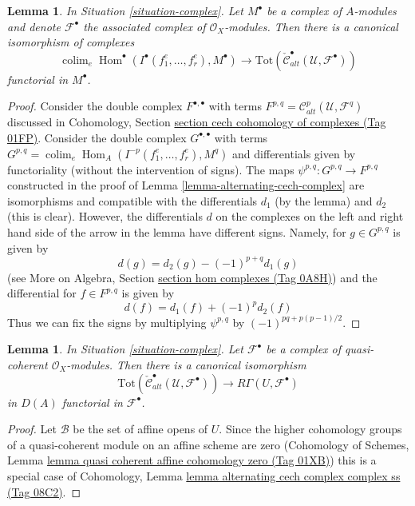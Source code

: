\documentclass{amsart}
\theoremstyle{plain}
\newtheorem{lemma}[subsection]{Lemma}
\theoremstyle{definition}
\theoremstyle{remark}
\numberwithin{equation}{subsection}
\def\colim{\mathop{\mathrm{colim}}\nolimits}
\def\Hom{\mathop{\mathrm{Hom}}\nolimits}
\begin{document}
\begin{lemma}
\label{lemma-alternating-cech-complex-complex}
In Situation \ref{situation-complex}. Let $M^\bullet$ be a
complex of $A$-modules and
denote $\mathcal{F}^\bullet$ the associated complex of
$\mathcal{O}_X$-modules. Then
there is a canonical isomorphism of complexes
$$
\colim_e \Hom^\bullet(I^\bullet(f_1^e, \ldots, f_r^e), M^\bullet)
\longrightarrow
\text{Tot}(\check{\mathcal{C}}_{alt}^\bullet(\mathcal{U}, \mathcal{F}^\bullet))
$$
functorial in $M^\bullet$.
\end{lemma}

\begin{proof}
Consider the double complex $F^{\bullet, \bullet}$ with terms
$F^{p, q} = \mathcal{C}_{alt}^p(\mathcal{U}, \mathcal{F}^q)$
discussed in
Cohomology, Section \href{https://stacks.math.columbia.edu/tag/01FP}{section cech cohomology of complexes (Tag 01FP)}.
Consider the double complex $G^{\bullet, \bullet}$ with terms
$G^{p, q} = \colim_e \Hom_A(I^{-p}(f_1^e, \ldots, f_r^e), M^q)$ and
differentials given by functoriality (without the intervention
of signs). The maps $\psi^{p, q} : G^{p, q} \to F^{p, q}$
constructed in the proof of Lemma \ref{lemma-alternating-cech-complex}
are isomorphisms and compatible with the differentials $d_1$ (by the lemma)
and $d_2$ (this is clear). However, the differentials $d$ on the
complexes on the left and right hand side of the arrow in the lemma
have different signs. Namely, for $g \in G^{p, q}$ is given by
$$
d(g) =  d_2(g) - (-1)^{p + q} d_1(g) 
$$
(see More on Algebra, Section \href{https://stacks.math.columbia.edu/tag/0A8H}{section hom complexes (Tag 0A8H)})
and the differential for $f \in F^{p, q}$ is given by
$$
d(f) = d_1(f) + (-1)^p d_2(f)
$$
Thus we can fix the signs by multiplying $\psi^{p, q}$ by
$(-1)^{pq + p(p - 1)/2}$.
\end{proof}


\begin{lemma}
\label{lemma-alternating-cech-complex-complex-computes-cohomology}
In Situation \ref{situation-complex}. Let $\mathcal{F}^\bullet$
be a complex of quasi-coherent $\mathcal{O}_X$-modules. Then
there is a canonical isomorphism
$$
\text{Tot}(\check{\mathcal{C}}_{alt}^\bullet(\mathcal{U}, \mathcal{F}^\bullet))
\longrightarrow
R\Gamma(U, \mathcal{F}^\bullet)
$$
in $D(A)$ functorial in $\mathcal{F}^\bullet$.
\end{lemma}

\begin{proof}
Let $\mathcal{B}$ be the set of affine opens of $U$. Since the higher
cohomology groups of a quasi-coherent module on an affine scheme are zero
(Cohomology of Schemes, Lemma
\href{https://stacks.math.columbia.edu/tag/01XB}{lemma quasi coherent affine cohomology zero (Tag 01XB)})
this is a special case of
Cohomology, Lemma \href{https://stacks.math.columbia.edu/tag/08C2}{lemma alternating cech complex complex ss (Tag 08C2)}.
\end{proof}
\end{document}
